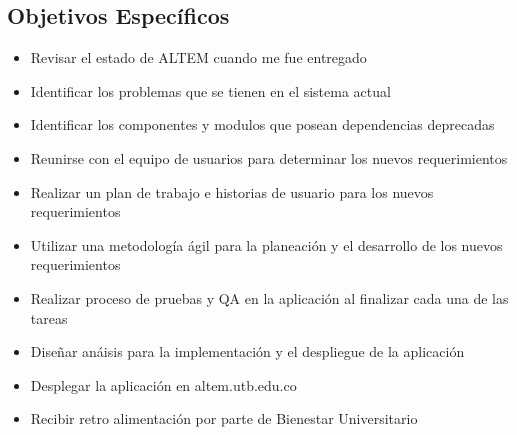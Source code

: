 \subsection{Objetivos Específicos}
\begin{itemize}
    \item Revisar el estado de ALTEM cuando me fue entregado
    \item Identificar los problemas que se tienen en el sistema actual
    \item Identificar los componentes y modulos que posean dependencias deprecadas
    \item Reunirse con el equipo de usuarios para determinar los nuevos requerimientos
    \item Realizar un plan de trabajo e historias de usuario para los nuevos requerimientos
    \item Utilizar una metodología ágil para la planeación y el desarrollo de los nuevos requerimientos
    \item Realizar proceso de pruebas y QA en la aplicación al finalizar cada una de las tareas
    \item Diseñar anáisis para la implementación y el despliegue de la aplicación
    \item Desplegar la aplicación en altem.utb.edu.co
    \item Recibir retro alimentación por parte de Bienestar Universitario
\end{itemize}